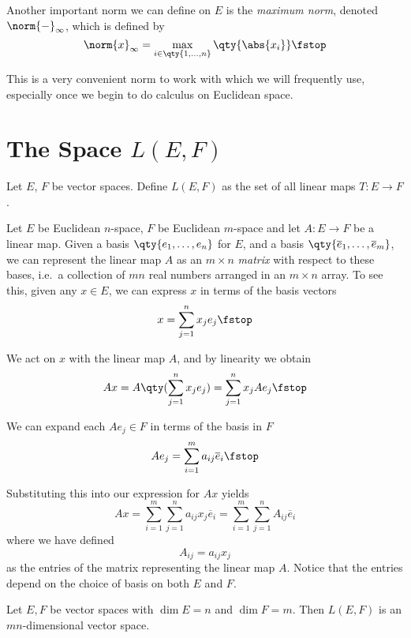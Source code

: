  \vspace{3mm}

 Another important norm we can define on \( E \) is the \emph{maximum norm}, denoted \( \norm{-}_\infty \), which is defined by
 \[ \norm{x}_\infty=\max_{i\in\qty{1,\dots, n}}\qty{\abs{x_i}}\fstop \]

 This is a very convenient norm to work with which we will frequently use, especially once we begin to do calculus on Euclidean space.
 
 \section{The Space \( L(E,F) \)}
 \label{sec:linear-maps}
 \begin{definition}
   Let \( E \), \( F \) be vector spaces. Define \( L(E,F) \) as the set of all linear maps \( T:E\to F \).
 \end{definition}

 Let \( E \) be Euclidean \( n \)-space, \( F \) be Euclidean \( m \)-space and let \( A:E\to F \) be a linear map. Given a basis \( \qty{e_1,\dots, e_n} \) for \( E \), and a basis \( \qty{\overline{e}_1,\dots,\overline{e}_m} \), we can represent the linear map \( A \) as an \( m\times n \) \emph{matrix} with respect to these bases, i.e.\ a collection of \( mn \) real numbers arranged in an \( m\times n \) array. To see this, given any \( x\in E \), we can express \( x \) in terms of the basis vectors
 \[ x=\sum_{j=1}^nx_je_j\fstop \]

 We act on \( x \) with the linear map \( A \), and by linearity we obtain
 \[ Ax=A\qty(\sum_{j=1}^nx_je_j)=\sum_{j=1}^nx_jAe_j\fstop \]

 We can expand each \( Ae_j\in F \) in terms of the basis in \( F \)
 \[ Ae_j=\sum_{i=1}^ma_{ij}\overline{e}_i\fstop \]

 Substituting this into our expression for \( Ax \) yields
 \[ Ax=\sum_{i=1}^m\sum_{j=1}^na_{ij}x_j\overline{e}_i=\sum_{i=1}^m\sum_{j=1}^nA_{ij}\overline{e}_i \]
 where we have defined
 \[ A_{ij}=a_{ij}x_j \]
 as the entries of the matrix representing the linear map \( A \). Notice that the entries depend on the choice of basis on both \( E \) and \( F \).
 
 \begin{theorem}
   Let \( E,F \) be vector spaces with \( \dim E=n \) and \( \dim F=m \). Then \( L(E,F) \) is an \( mn \)-dimensional vector space.
 \end{theorem}

